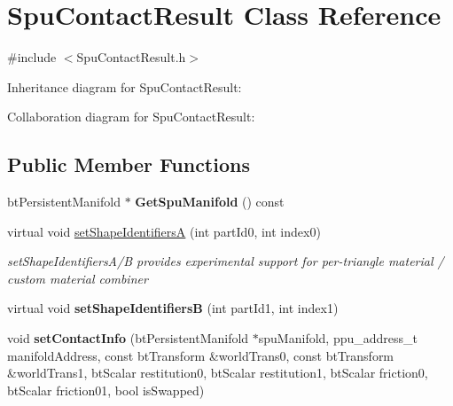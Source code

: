 \hypertarget{class_spu_contact_result}{\section{Spu\+Contact\+Result Class Reference}
\label{class_spu_contact_result}
}


{\ttfamily \#include $<$Spu\+Contact\+Result.\+h$>$}



Inheritance diagram for Spu\+Contact\+Result\+:


Collaboration diagram for Spu\+Contact\+Result\+:
\subsection*{Public Member Functions}
\begin{DoxyCompactItemize}
\item 
\hypertarget{class_spu_contact_result_a925a45566ba702ecb97706fb684c7c69}{bt\+Persistent\+Manifold $\ast$ {\bfseries Get\+Spu\+Manifold} () const }\label{class_spu_contact_result_a925a45566ba702ecb97706fb684c7c69}

\item 
\hypertarget{class_spu_contact_result_a7e776f85c0ddf51cfa0b391e82c737d8}{virtual void \hyperlink{class_spu_contact_result_a7e776f85c0ddf51cfa0b391e82c737d8}{set\+Shape\+Identifiers\+A} (int part\+Id0, int index0)}\label{class_spu_contact_result_a7e776f85c0ddf51cfa0b391e82c737d8}

\begin{DoxyCompactList}\small\item\em set\+Shape\+Identifiers\+A/\+B provides experimental support for per-\/triangle material / custom material combiner \end{DoxyCompactList}\item 
\hypertarget{class_spu_contact_result_af740203419b21a7bd479ed701d85e3e3}{virtual void {\bfseries set\+Shape\+Identifiers\+B} (int part\+Id1, int index1)}\label{class_spu_contact_result_af740203419b21a7bd479ed701d85e3e3}

\item 
\hypertarget{class_spu_contact_result_ad7f7b13a470a2ecc15dc220712c38c1c}{void {\bfseries set\+Contact\+Info} (bt\+Persistent\+Manifold $\ast$spu\+Manifold, ppu\+\_\+address\+\_\+t manifold\+Address, const bt\+Transform \&world\+Trans0, const bt\+Transform \&world\+Trans1, bt\+Scalar restitution0, bt\+Scalar restitution1, bt\+Scalar friction0, bt\+Scalar friction01, bool is\+Swapped)}\label{class_spu_contact_result_ad7f7b13a470a2ecc15dc220712c38c1c}


\end{DoxyCompactItemize}
